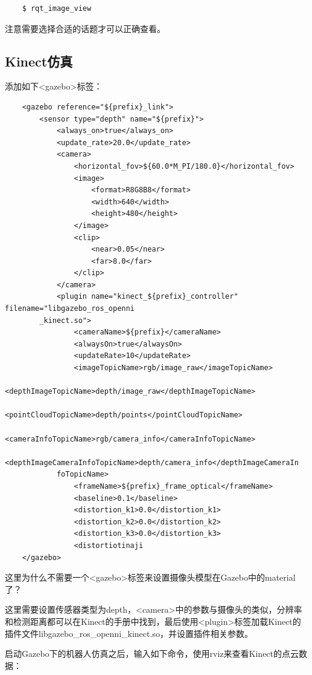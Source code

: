 \documentclass[9pt, oneside]{book}
\begin{document}
\begin{verbatim}
    $ rqt_image_view
\end{verbatim}

注意需要选择合适的话题才可以正确查看。

\subsection{Kinect仿真}

添加如下<gazebo>标签：

\begin{verbatim}
    <gazebo reference="${prefix}_link">
        <sensor type="depth" name="${prefix}">
            <always_on>true</always_on>
            <update_rate>20.0</update_rate>
            <camera>
                <horizontal_fov>${60.0*M_PI/180.0}</horizontal_fov>
                <image>
                    <format>R8G8B8</format>
                    <width>640</width>
                    <height>480</height>
                </image>
                <clip>
                    <near>0.05</near>
                    <far>8.0</far>
                </clip>
            </camera>
            <plugin name="kinect_${prefix}_controller" filename="libgazebo_ros_openni
        _kinect.so">
                <cameraName>${prefix}</cameraName>
                <alwaysOn>true</alwaysOn>
                <updateRate>10</updateRate>
                <imageTopicName>rgb/image_raw</imageTopicName>
                <depthImageTopicName>depth/image_raw</depthImageTopicName>
                <pointCloudTopicName>depth/points</pointCloudTopicName>
                <cameraInfoTopicName>rgb/camera_info</cameraInfoTopicName>
                <depthImageCameraInfoTopicName>depth/camera_info</depthImageCameraIn
            foTopicName>
                <frameName>${prefix}_frame_optical</frameName>
                <baseline>0.1</baseline>
                <distortion_k1>0.0</distortion_k1>
                <distortion_k2>0.0</distortion_k2>
                <distortion_k3>0.0</distortion_k3>
                <distortiotinaji
    </gazebo>
\end{verbatim}

\textcolor[rgb]{1,0,0}{这里为什么不需要一个<gazebo>标签来设置摄像头模型在Gazebo中的material了？} 

这里需要设置传感器类型为depth，<camera>中的参数与摄像头的类似，分辨率和检测距离都可以在Kinect的手册中找到，最后使用<plugin>标签加载Kinect的插件文件libgazebo\_ros\_openni\_kinect.so，并设置插件相关参数。

启动Gazebo下的机器人仿真之后，输入如下命令，使用rviz来查看Kinect的点云数据：
\end{document}
